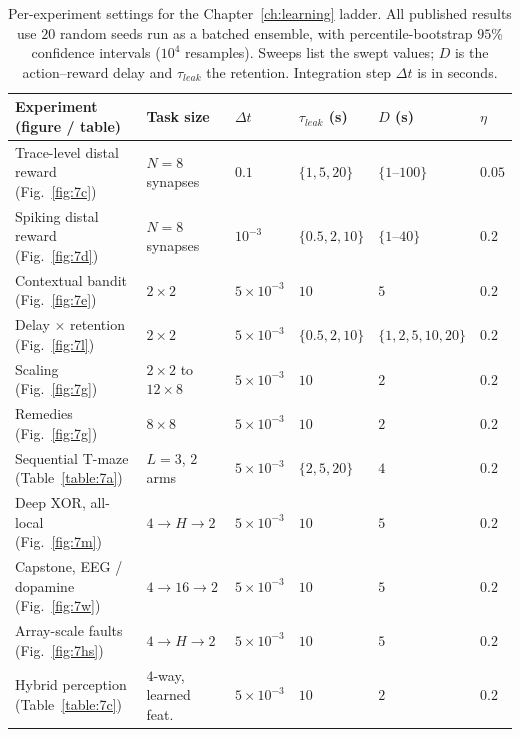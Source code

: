 \begin{table}[htbp!]
    \caption[Per-experiment reinforcement-learning task settings.]{Per-experiment
    settings for the Chapter~\ref{ch:learning} ladder. All published results use $20$ random
    seeds run as a batched ensemble, with percentile-bootstrap $95\%$ confidence
    intervals ($10^4$ resamples). Sweeps list the swept values; $D$ is the
    action--reward delay and $\tau_{leak}$ the retention. Integration step $\Delta t$
    is in seconds.}
    \begin{center}
    \footnotesize
    \begin{tabularx}{\textwidth}{@{}X l l l l l@{}}
    \toprule
    Experiment (figure / table) & Task size & $\Delta t$ & $\tau_{leak}$ (s) & $D$ (s) & $\eta$ \\
    \midrule
    Trace-level distal reward (Fig.~\ref{fig:7c}) & $N=8$ synapses & $0.1$ & $\{1,5,20\}$ & $\{1\text{--}100\}$ & $0.05$ \\
    Spiking distal reward (Fig.~\ref{fig:7d}) & $N=8$ synapses & $10^{-3}$ & $\{0.5,2,10\}$ & $\{1\text{--}40\}$ & $0.2$ \\
    Contextual bandit (Fig.~\ref{fig:7e}) & $2\times2$ & $5\times10^{-3}$ & $10$ & $5$ & $0.2$ \\
    Delay $\times$ retention (Fig.~\ref{fig:7l}) & $2\times2$ & $5\times10^{-3}$ & $\{0.5,2,10\}$ & $\{1,2,5,10,20\}$ & $0.2$ \\
    Scaling (Fig.~\ref{fig:7g}) & $2\times2$ to $12\times8$ & $5\times10^{-3}$ & $10$ & $2$ & $0.2$ \\
    Remedies (Fig.~\ref{fig:7g}) & $8\times8$ & $5\times10^{-3}$ & $10$ & $2$ & $0.2$ \\
    Sequential T-maze (Table~\ref{table:7a}) & $L=3$, $2$ arms & $5\times10^{-3}$ & $\{2,5,20\}$ & $4$ & $0.2$ \\
    Deep XOR, all-local (Fig.~\ref{fig:7m}) & $4\to H\to2$ & $5\times10^{-3}$ & $10$ & $5$ & $0.2$ \\
    Capstone, EEG / dopamine (Fig.~\ref{fig:7w}) & $4\to16\to2$ & $5\times10^{-3}$ & $10$ & $5$ & $0.2$ \\
    Array-scale faults (Fig.~\ref{fig:7hs}) & $4\to H\to2$ & $5\times10^{-3}$ & $10$ & $5$ & $0.2$ \\
    Hybrid perception (Table~\ref{table:7c}) & $4$-way, learned feat. & $5\times10^{-3}$ & $10$ & $2$ & $0.2$ \\
    \bottomrule
    \end{tabularx}

\end{center}
\end{table}
